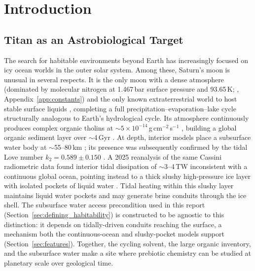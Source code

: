 \chapter{Introduction}
\label{ch:introduction}

\section{Titan as an Astrobiological Target}
\label{sec:search_context}

The search for habitable environments beyond Earth has increasingly focused on icy ocean worlds in the outer solar system.  Among these, Saturn's moon \titan{} is unusual in several respects.
It is the only moon with a dense atmosphere (dominated by molecular nitrogen
at 1.467\,bar surface pressure and 93.65\,K; \citealt{Fulchignoni2005}, Appendix~\ref{app:constants}) and the
only known extraterrestrial world to host stable surface liquids
\citep{Stofan2007}, completing a full precipitation--evaporation--lake cycle
structurally analogous to Earth's hydrological cycle.  Its atmosphere
continuously produces complex organic tholins at
$\sim5\times10^{-14}$\,g\,cm$^{-2}$\,s$^{-1}$ \citep{Lavvas2011}, building
a global organic sediment layer over $\sim$4\,Gyr \citep{Lorenz2008}.
At depth, interior models place a subsurface water body at $\sim$55--80\,km
\citep{Tobie2005}; its presence was subsequently confirmed by the tidal Love
number $k_2 = 0.589\pm0.150$ \citep{Iess2012}.  A 2025 reanalysis of the same Cassini radiometric data found interior tidal dissipation of $\sim$3--4\,TW inconsistent with a continuous global ocean, pointing instead to a thick slushy high-pressure ice layer with isolated pockets of liquid water \citep{Petricca2025}.  Tidal heating within this slushy layer maintains liquid water pockets and may generate brine conduits through the ice shell. The subsurface water access precondition used in this report (Section~\ref{sec:defining_habitability}) is constructed to be agnostic to this distinction: it depends on tidally-driven conduits reaching the surface, a mechanism both the continuous-ocean and slushy-pocket models support (Section~\ref{sec:features}). Together, the cycling solvent, the large organic inventory, and the subsurface water make \titan{} a site where prebiotic chemistry can be studied at planetary scale over geological time.

